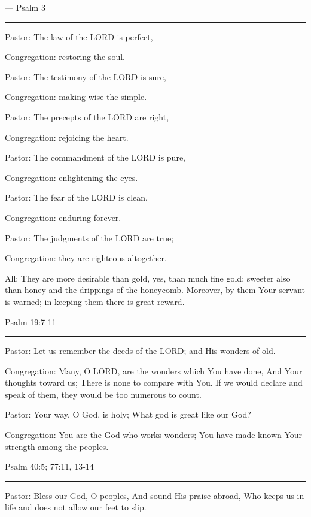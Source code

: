 \documentclass[]{book}
\begin{document}
--- \textbar{} Psalm 3 \textbar{}

\begin{center}\rule{0.5\linewidth}{\linethickness}\end{center}

Pastor: The law of the LORD is perfect,

Congregation: restoring the soul.

Pastor: The testimony of the LORD is sure,

Congregation: making wise the simple.

Pastor: The precepts of the LORD are right,

Congregation: rejoicing the heart.

Pastor: The commandment of the LORD is pure,

Congregation: enlightening the eyes.

Pastor: The fear of the LORD is clean,

Congregation: enduring forever.

Pastor: The judgments of the LORD are true;

Congregation: they are righteous altogether.

All: They are more desirable than gold, yes, than much fine gold;
sweeter also than honey and the drippings of the honeycomb. Moreover, by
them Your servant is warned; in keeping them there is great reward.

Psalm 19:7-11 \textbar{}

\begin{center}\rule{0.5\linewidth}{\linethickness}\end{center}

Pastor: Let us remember the deeds of the LORD; and His wonders of old.

Congregation: Many, O LORD, are the wonders which You have done, And
Your thoughts toward us; There is none to compare with You. If we would
declare and speak of them, they would be too numerous to count.

Pastor: Your way, O God, is holy; What god is great like our God?

Congregation: You are the God who works wonders; You have made known
Your strength among the peoples.

Psalm 40:5; 77:11, 13-14 \textbar{}

\begin{center}\rule{0.5\linewidth}{\linethickness}\end{center}

Pastor: Bless our God, O peoples, And sound His praise abroad, Who keeps
us in life and does not allow our feet to slip.
\end{document}
